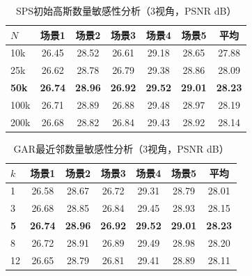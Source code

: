 \begin{table}[htbp]
    \centering
    \caption{SPS初始高斯数量敏感性分析（3视角，PSNR dB）}
    \label{tab:spags_sps_hyper}
    \begin{tabular}{lcccccc}
        \toprule
        $N$ & 场景1 & 场景2 & 场景3 & 场景4 & 场景5 & 平均 \\
        \midrule
        10k & 26.45 & 28.52 & 26.61 & 29.18 & 28.65 & 27.88 \\
        25k & 26.62 & 28.78 & 26.79 & 29.38 & 28.86 & 28.09 \\
        \textbf{50k} & \textbf{26.74} & \textbf{28.96} & \textbf{26.92} & \textbf{29.52} & \textbf{29.01} & \textbf{28.23} \\
        100k & 26.71 & 28.89 & 26.88 & 29.48 & 28.97 & 28.19 \\
        200k & 26.68 & 28.82 & 26.84 & 29.43 & 28.92 & 28.14 \\
        \bottomrule
    \end{tabular}
\end{table}

\begin{table}[htbp]
    \centering
    \caption{GAR最近邻数量敏感性分析（3视角，PSNR dB）}
    \label{tab:spags_gar_hyper}
    \begin{tabular}{lcccccc}
        \toprule
        $k$ & 场景1 & 场景2 & 场景3 & 场景4 & 场景5 & 平均 \\
        \midrule
        1 & 26.58 & 28.67 & 26.72 & 29.31 & 28.79 & 28.01 \\
        3 & 26.68 & 28.85 & 26.84 & 29.45 & 28.93 & 28.15 \\
        \textbf{5} & \textbf{26.74} & \textbf{28.96} & \textbf{26.92} & \textbf{29.52} & \textbf{29.01} & \textbf{28.23} \\
        8 & 26.72 & 28.91 & 26.89 & 29.49 & 28.98 & 28.20 \\
        12 & 26.65 & 28.79 & 26.81 & 29.41 & 28.89 & 28.11 \\
        \bottomrule
    \end{tabular}
\end{table}

